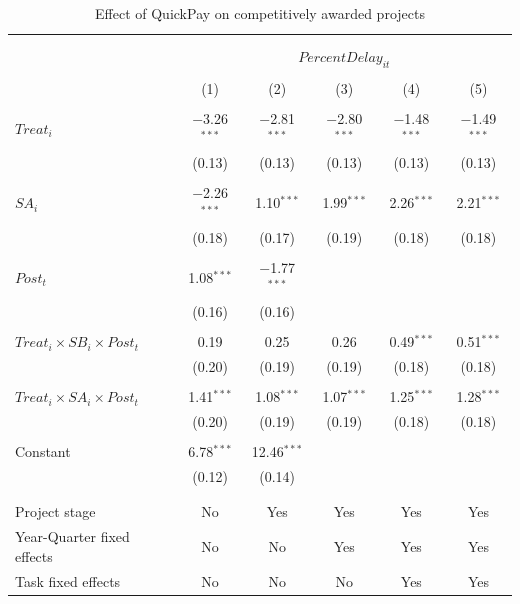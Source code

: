 \documentclass[
]{article}
\begin{document}
\begin{table}[H] \centering 
  \caption{Effect of QuickPay on competitively awarded projects} 
  \label{} 
\small 
\begin{tabular}{@{\extracolsep{-2pt}}lccccc} 
\\[-1.8ex]\hline 
\hline \\[-1.8ex] 
\\[-1.8ex] & \multicolumn{5}{c}{$PercentDelay_{it}$  } \\ 
\\[-1.8ex] & (1) & (2) & (3) & (4) & (5)\\ 
\hline \\[-1.8ex] 
 $Treat_i$ & $-$3.26$^{***}$ & $-$2.81$^{***}$ & $-$2.80$^{***}$ & $-$1.48$^{***}$ & $-$1.49$^{***}$ \\ 
  & (0.13) & (0.13) & (0.13) & (0.13) & (0.13) \\ 
  & & & & & \\ 
 $SA_i$ & $-$2.26$^{***}$ & 1.10$^{***}$ & 1.99$^{***}$ & 2.26$^{***}$ & 2.21$^{***}$ \\ 
  & (0.18) & (0.17) & (0.19) & (0.18) & (0.18) \\ 
  & & & & & \\ 
 $Post_t$ & 1.08$^{***}$ & $-$1.77$^{***}$ &  &  &  \\ 
  & (0.16) & (0.16) &  &  &  \\ 
  & & & & & \\ 
 $Treat_i \times SB_i \times Post_t$ & 0.19 & 0.25 & 0.26 & 0.49$^{***}$ & 0.51$^{***}$ \\ 
  & (0.20) & (0.19) & (0.19) & (0.18) & (0.18) \\ 
  & & & & & \\ 
 $Treat_i \times SA_i \times Post_t$ & 1.41$^{***}$ & 1.08$^{***}$ & 1.07$^{***}$ & 1.25$^{***}$ & 1.28$^{***}$ \\ 
  & (0.20) & (0.19) & (0.19) & (0.18) & (0.18) \\ 
  & & & & & \\ 
 Constant & 6.78$^{***}$ & 12.46$^{***}$ &  &  &  \\ 
  & (0.12) & (0.14) &  &  &  \\ 
  & & & & & \\ 
\hline \\[-1.8ex] 
Project stage & No & Yes & Yes & Yes & Yes \\ 
Year-Quarter fixed effects & No & No & Yes & Yes & Yes \\ 
Task fixed effects & No & No & No & Yes & Yes \\ 

\end{tabular}
\end{table}
\end{document}
